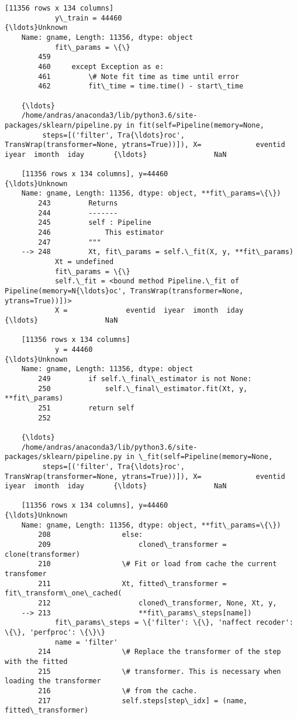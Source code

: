 \documentclass[11pt]{article}
\begin{document}
\begin{Verbatim}[commandchars=\\\{\}]
    [11356 rows x 134 columns]
            y\_train = 44460                                           {\ldots}Unknown
    Name: gname, Length: 11356, dtype: object
            fit\_params = \{\}
        459 
        460     except Exception as e:
        461         \# Note fit time as time until error
        462         fit\_time = time.time() - start\_time
    
    {\ldots}
    /home/andras/anaconda3/lib/python3.6/site-packages/sklearn/pipeline.py in fit(self=Pipeline(memory=None,
         steps=[('filter', Tra{\ldots}roc', TransWrap(transformer=None, ytrans=True))]), X=             eventid  iyear  imonth  iday       {\ldots}                NaN  
    
    [11356 rows x 134 columns], y=44460                                           {\ldots}Unknown
    Name: gname, Length: 11356, dtype: object, **fit\_params=\{\})
        243         Returns
        244         -------
        245         self : Pipeline
        246             This estimator
        247         """
    --> 248         Xt, fit\_params = self.\_fit(X, y, **fit\_params)
            Xt = undefined
            fit\_params = \{\}
            self.\_fit = <bound method Pipeline.\_fit of Pipeline(memory=N{\ldots}oc', TransWrap(transformer=None, ytrans=True))])>
            X =              eventid  iyear  imonth  iday       {\ldots}                NaN  
    
    [11356 rows x 134 columns]
            y = 44460                                           {\ldots}Unknown
    Name: gname, Length: 11356, dtype: object
        249         if self.\_final\_estimator is not None:
        250             self.\_final\_estimator.fit(Xt, y, **fit\_params)
        251         return self
        252 
    
    {\ldots}
    /home/andras/anaconda3/lib/python3.6/site-packages/sklearn/pipeline.py in \_fit(self=Pipeline(memory=None,
         steps=[('filter', Tra{\ldots}roc', TransWrap(transformer=None, ytrans=True))]), X=             eventid  iyear  imonth  iday       {\ldots}                NaN  
    
    [11356 rows x 134 columns], y=44460                                           {\ldots}Unknown
    Name: gname, Length: 11356, dtype: object, **fit\_params=\{\})
        208                 else:
        209                     cloned\_transformer = clone(transformer)
        210                 \# Fit or load from cache the current transfomer
        211                 Xt, fitted\_transformer = fit\_transform\_one\_cached(
        212                     cloned\_transformer, None, Xt, y,
    --> 213                     **fit\_params\_steps[name])
            fit\_params\_steps = \{'filter': \{\}, 'naffect recoder': \{\}, 'perfproc': \{\}\}
            name = 'filter'
        214                 \# Replace the transformer of the step with the fitted
        215                 \# transformer. This is necessary when loading the transformer
        216                 \# from the cache.
        217                 self.steps[step\_idx] = (name, fitted\_transformer)
    

\end{Verbatim}
\end{document}
